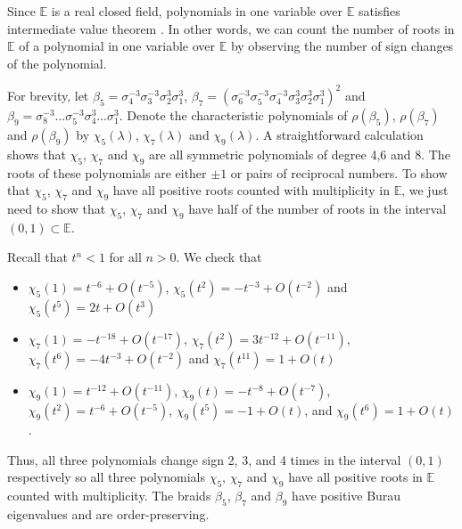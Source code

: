\documentclass{amsart}
\makeatletter
\renewenvironment{proof}[1][\proofname]{%
   \par\pushQED{\qed}\normalfont%
   \topsep6\p@\@plus6\p@\relax
   \trivlist\item[\hskip\labelsep\bfseries#1\@addpunct{.}]%
   \ignorespaces
}{%
   \popQED\endtrivlist\@endpefalse
}
\makeatother
\begin{document}
\begin{proof}
    Since $\mathbb{E}$ is a real closed field, polynomials in one variable over $\mathbb{E}$ satisfies intermediate value theorem \cite[Chapter XI, \S 2, Theorem 2.5]{LangAlgebra}. In other words, we can count the number of roots in $\mathbb{E}$ of a polynomial in one variable over $\mathbb{E}$ by observing the number of sign changes of the polynomial. 

    For brevity, let $\beta_5 = \sigma_4^{-3}\sigma_3^{-3}\sigma_2^3\sigma_1^3$, $\beta_7 = (\sigma_6^{-3}\sigma_5^{-3}\sigma_4^{-3}\sigma_3^{3}\sigma_2^{3}\sigma_1^{3})^2$ and $\beta_9 = \sigma_8^{-3}\dots\sigma_5^{-3}\sigma_4^{3}\dots\sigma_1^{3}$.
    Denote the characteristic polynomials of $\rho(\beta_5)$, $\rho(\beta_7)$ and $\rho(\beta_9)$ by $\chi_5(\lambda)$, $\chi_7(\lambda)$ and $\chi_9(\lambda)$. A straightforward calculation shows that $\chi_5$, $\chi_7$ and $\chi_9$ are all symmetric polynomials of degree 4,6 and 8. The roots of these polynomials are either $\pm 1$ or pairs of reciprocal numbers. To show that $\chi_5$, $\chi_7$ and $\chi_9$ have all positive roots counted with multiplicity in $\mathbb{E}$, we just need to show that $\chi_5$, $\chi_7$ and $\chi_9$ have half of the number of roots in the interval $(0,1) \subset \mathbb{E}$. 
     
     Recall that $t^n < 1$ for all $n>0$. We check that
     \begin{itemize}
         \item  $\chi_5(1) = t^{-6} + O(t^{-5})$, $\chi_5(t^2) = -t^{-3} + O(t^{-2})$ and $\chi_5(t^5) = 2t + O(t^{3})$
         \item  $\chi_7(1) = -t^{-18} + O(t^{-17})$, $\chi_7(t^2) = 3t^{-12} + O(t^{-11})$,  $\chi_7(t^6) = -4t^{-3} + O(t^{-2})$ and $\chi_7(t^{11}) = 1 + O(t)$
         \item $\chi_9(1) = t^{-12} +O(t^{-11})$, $\chi_9(t) = -t^{-8} +O(t^{-7})$, $\chi_9(t^2) = t^{-6} +O(t^{-5})$, $\chi_9(t^5) = -1 +O(t)$, and $\chi_9(t^6) = 1 +O(t)$.
     \end{itemize}
     Thus, all three polynomials change sign 2, 3, and 4 times in the interval $(0,1)$ respectively so all three polynomials $\chi_5$, $\chi_7$ and $\chi_9$ have all positive roots in $\mathbb{E}$ counted with multiplicity. The braids $\beta_5$, $\beta_7$ and $\beta_9$ have positive Burau eigenvalues and are order-preserving. 
     

   
    
    
\end{proof}
\end{document}
